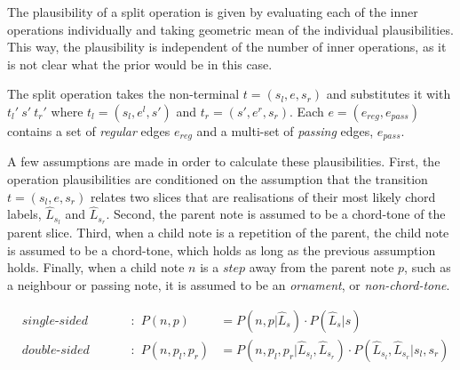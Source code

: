 \documentclass[12pt,a4paper,twoside,openany]{report} \usepackage[pdfborder={0 0 0}]{hyperref}    %
\theoremstyle{definition} \newtheorem{definition}{Definition}[section]
\begin{document}
    The plausibility of a split operation is given by evaluating each of the inner operations
    individually and taking geometric mean of the individual plausibilities. This way, the plausibility is independent
    of the number of inner operations, as it is not clear what the prior would be in this case.  

    The split operation takes the non-terminal $t = (s_l, e, s_r)$ and substitutes it with $t_l'~ s' ~ t_r'$ where $t_l
    = (s_l, e^{l}, s')$ and $t_r = (s', e^{r}, s_r)$. Each $e = (e_{reg}, e_{pass})$ contains a set of \textit{regular}
    edges $e_{reg}$ and a multi-set of  \textit{passing} edges, $e_{pass}$.

    A few assumptions are made in order to calculate these plausibilities. First, the operation plausibilities are
    conditioned on the assumption that the transition $t = (s_l, e, s_r)$ relates two slices that are realisations
    of their most likely chord labels, $\hat{L}_{s_l}$ and $\hat{L}_{s_r}$. 
    Second, the parent note is assumed to be a chord-tone of the parent slice.
    Third, when a child note is a repetition of the parent, the child note is assumed to be a chord-tone, which holds as long as the previous assumption holds.
    Finally, when a child note $n$ is a $step$ away from the parent note $p$, such as a neighbour or passing note, it is assumed to be an \textit{ornament}, or \textit{non-chord-tone}. 

    \begin{equation}
      \begin{aligned}
                &\textit{single-sided operations}: 
                  &P(n, p) &= P(n, p | \hat{L}_s) \cdot P(\hat{L}_s | s) \\
                &\textit{double-sided operations}:
                  &P(n, p_l, p_r) &= P(n, p_l, p_r | \hat{L}_{s_l}, \hat{L}_{s_r}) \cdot P(\hat{L}_{s_l}, \hat{L}_{s_r}|
                s_l, s_r) \\
      \end{aligned}
      \label{eq:}
    \end{equation}
\end{document}
